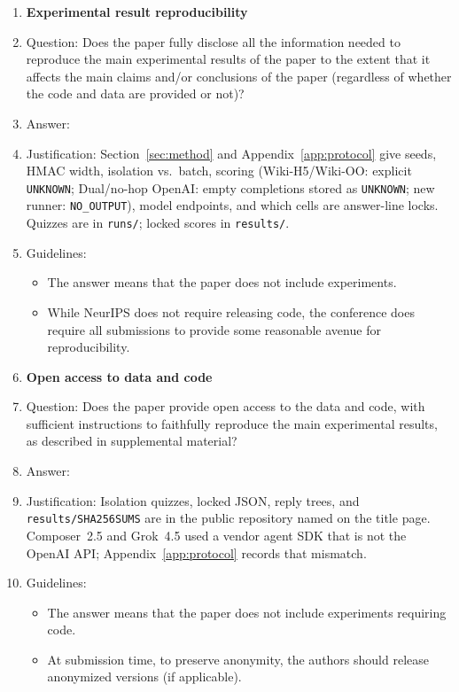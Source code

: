 \begin{enumerate}
\item {\bf Experimental result reproducibility}
\item[] Question: Does the paper fully disclose all the information needed to reproduce the main experimental results of the paper to the extent that it affects the main claims and/or conclusions of the paper (regardless of whether the code and data are provided or not)?
\item[] Answer: \answerYes{}
\item[] Justification: Section~\ref{sec:method} and Appendix~\ref{app:protocol} give seeds, HMAC width, isolation vs.\ batch, scoring (Wiki-H5/Wiki-OO: explicit \texttt{UNKNOWN}; Dual/no-hop OpenAI: empty completions stored as \texttt{UNKNOWN}; new runner: \texttt{NO\_OUTPUT}), model endpoints, and which cells are answer-line locks. Quizzes are in \texttt{runs/}; locked scores in \texttt{results/}.
\item[] Guidelines:
\begin{itemize}
\item The answer \answerNA{} means that the paper does not include experiments.
\item While NeurIPS does not require releasing code, the conference does require all submissions to provide some reasonable avenue for reproducibility.
\end{itemize}

\item {\bf Open access to data and code}
\item[] Question: Does the paper provide open access to the data and code, with sufficient instructions to faithfully reproduce the main experimental results, as described in supplemental material?
\item[] Answer: \answerYes{}
\item[] Justification: Isolation quizzes, locked JSON, reply trees, and \texttt{results/SHA256SUMS} are in the public repository named on the title page. Composer~2.5 and Grok~4.5 used a vendor agent SDK that is not the OpenAI API; Appendix~\ref{app:protocol} records that mismatch.
\item[] Guidelines:
\begin{itemize}
\item The answer \answerNA{} means that the paper does not include experiments requiring code.
\item At submission time, to preserve anonymity, the authors should release anonymized versions (if applicable).
\end{itemize}


\end{enumerate}
